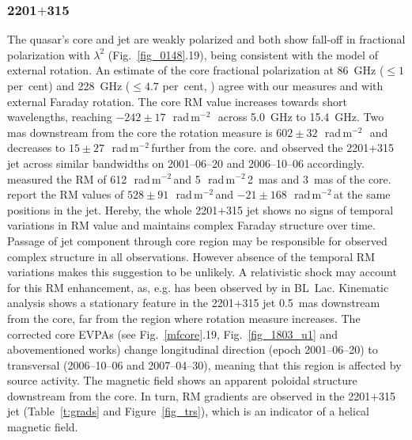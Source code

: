 \documentclass[a4paper,fleqn,usenatbib,useAMS]{mnras}
\newcommand{\rmu}{\,rad\,m$^{-2}$\,} %
\begin{document}
\subsubsection{2201$+$315}
The quasar's core and jet are weakly polarized and both show fall-off in fractional polarization with $\lambda^2$ (Fig.~\ref{fig_0148}.19), being consistent with the model of external rotation.
An estimate of the core fractional polarization at 86~GHz ($\leq1$ per~cent) and 228~GHz ($\leq4.7$ per~cent, \citealt{agudo_etal14}) agree with our measures and with external Faraday rotation.
The core RM value increases towards short wavelengths, reaching $-242\pm17$~\rmu\ across 5.0~GHz to 15.4~GHz.
Two mas downstream from the core the rotation measure is $602\pm32$~\rmu\ and decreases to $15\pm27$~\rmu further from the core.
\citet{zavala_taylor_04} and \citet{hovatta_etal12} observed the 2201$+$315 jet across similar bandwidths on 2001--06--20 and 2006--10--06 accordingly. \citeauthor{zavala_taylor_04} measured the RM of 612~\rmu and 5~\rmu 2~mas and 3~mas of the core. \citeauthor{hovatta_etal12} report the RM values of $528\pm91$~\rmu and $-21\pm168$~\rmu at the same positions in the jet. Hereby, the whole 2201$+$315 jet shows no signs of temporal variations in RM value and maintains complex Faraday structure over time.
Passage of jet component \citep[as seen in][]{2016AJ....152...12L} through core region may be responsible for observed complex structure in all observations.
However absence of the temporal RM variations makes this suggestion to be unlikely.
A relativistic shock may account for this RM enhancement, as, e.g. has been observed by \citet{2016ApJ...817...96G} in BL~Lac.
Kinematic analysis shows a stationary feature in the 2201$+$315 jet \citep{2016AJ....152...12L} 0.5~mas downstream from the core, far from the region where rotation measure increases. 
The corrected core EVPAs (see Fig.~\ref{mfcore}.19, Fig.~\ref{fig_1803_u1} and abovementioned works) change longitudinal direction (epoch 2001--06--20) to transversal (2006--10--06 and 2007--04--30), meaning that this region is affected by source activity.
The magnetic field shows an apparent poloidal structure downstream from the core.
In turn, RM gradients are observed in the 2201$+$315 jet (Table~\ref{t:grads} and Figure~\ref{fig_trs}), which is an indicator of a helical magnetic field.
\end{document}
